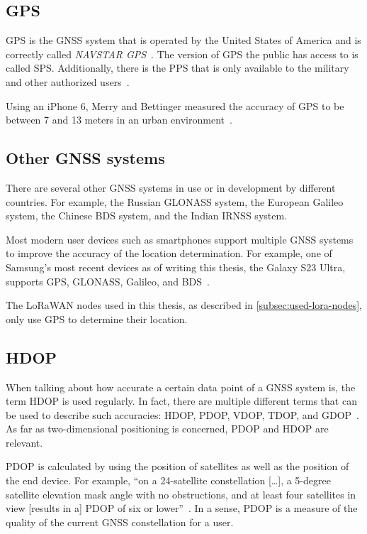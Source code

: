 \subsection{\acf{GPS}}

\ac{GPS} is the \ac{GNSS} system that is operated by the United States of America and is correctly called \emph{NAVSTAR \ac{GPS}}~\cite{department_of_defense_usa_gps_2020}.
The version of GPS the public has access to is called \acf{SPS}.
Additionally, there is the \acf{PPS} that is only available to the military and other authorized users~\cite{department_of_defense_usa_gps_2007}.

Using an iPhone 6, Merry and Bettinger measured the accuracy of \ac{GPS} to be between 7 and 13 meters in an urban environment~\cite{merry_smartphone_2019}.

\subsection{Other \acs{GNSS} systems}

There are several other \ac{GNSS} systems in use or in development by different countries.
For example, the Russian \acf{GLONASS} system, the European \acf{Galileo} system, the Chinese \acf{BDS} system, and the Indian \acf{IRNSS} system.

Most modern user devices such as smartphones support multiple \ac{GNSS} systems to improve the accuracy of the location determination.
For example, one of Samsung's most recent devices as of writing this thesis, the Galaxy S23 Ultra, supports \ac{GPS}, \ac{GLONASS}, \ac{Galileo}, and \ac{BDS}~\cite{gsmarena_samsung_2023}.

The \ac{LoRaWAN} nodes used in this thesis, as described in \cref{subsec:used-lora-nodes}, only use \ac{GPS} to determine their location.

\subsection{\acf{HDOP}}

When talking about how accurate a certain data point of a \ac{GNSS} system is, the term \ac{HDOP} is used regularly.
In fact, there are multiple different terms that can be used to describe such accuracies: \ac{HDOP}, \ac{PDOP}, \ac{VDOP}, \ac{TDOP}, and \ac{GDOP}~\cite{langley_dilution_1999}.
As far as two-dimensional positioning is concerned, \ac{PDOP} and \ac{HDOP} are relevant.

\ac{PDOP} is calculated by using the position of satellites as well as the position of the end device.
For example, ``on a 24-satellite constellation […], a 5-degree satellite elevation mask angle with no obstructions, and at least four satellites in view [results in a] \acf{PDOP} of six or lower''~\cite{langley_dilution_1999}.
In a sense, \ac{PDOP} is a measure of the quality of the current \ac{GNSS} constellation for a user.

